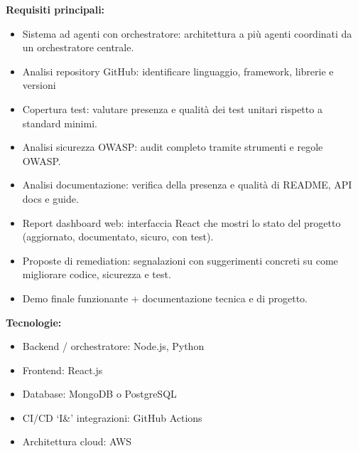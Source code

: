 \vspace{0.3cm}
\textbf{Requisiti principali:}
\begin{itemize}
	\item {Sistema ad agenti con orchestratore: architettura a più agenti coordinati da un orchestratore centrale.}
	\item {Analisi repository GitHub: identificare linguaggio, framework, librerie e versioni}
    \item {Copertura test: valutare presenza e qualità dei test unitari rispetto a standard minimi.}
    \item {Analisi sicurezza OWASP: audit completo tramite strumenti e regole OWASP.}
    \item {Analisi documentazione: verifica della presenza e qualità di README, API docs e guide.}
    \item {Report dashboard web: interfaccia React che mostri lo stato del progetto (aggiornato, documentato, sicuro, con test).}
    \item {Proposte di remediation: segnalazioni con suggerimenti concreti su come migliorare codice, sicurezza e test.}
    \item {Demo finale funzionante + documentazione tecnica e di progetto.}
\end{itemize}

\vspace{0.3cm}
\textbf{Tecnologie:}
\begin{itemize}
	\item {Backend / orchestratore: Node.js, Python}
    \item {Frontend: React.js}
    \item {Database: MongoDB o PostgreSQL}
    \item {CI/CD `I\&' integrazioni: GitHub Actions}
    \item {Architettura cloud: AWS}
\end{itemize}

